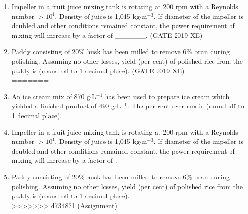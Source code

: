 \documentclass[journal,12pt,onecolumn]{IEEEtran}
\begin{document}
\begin{enumerate}
\item Impeller in a fruit juice mixing tank is rotating at 200 rpm with a Reynolds number $>10^{4}$. Density of juice is 1,045 kg$\cdot$m$^{-3}$. If diameter of the impeller is doubled and other conditions remained constant, the power requirement of mixing will increase by a factor of \_\_\_\_\_\_.
\hfill{(GATE 2019 XE)} \\


\item Paddy consisting of 20\% husk has been milled to remove 6\% bran during polishing. Assuming no other losses, yield (per cent) of polished rice from the paddy is \underline{\hspace{2cm}} (round off to 1 decimal place).
\hfill{(GATE 2019 XE)} \\

=======

\vspace{0.5cm}

\item An ice cream mix of 870 g$\cdot$L$^{-1}$ has been used to prepare ice cream which yielded a finished product of 490 g$\cdot$L$^{-1}$. The per cent over run is \underline{\hspace{2cm}} (round off to 1 decimal place).
\hfill{} \\

\vspace{0.5cm}

\item Impeller in a fruit juice mixing tank is rotating at 200 rpm with a Reynolds number $>10^{4}$. Density of juice is 1,045 kg$\cdot$m$^{-3}$. If diameter of the impeller is doubled and other conditions remained constant, the power requirement of mixing will increase by a factor of \underline{\hspace{2cm}}.
\hfill{} \\

\vspace{0.5cm}

\item Paddy consisting of 20\% husk has been milled to remove 6\% bran during polishing. Assuming no other losses, yield (per cent) of polished rice from the paddy is \underline{\hspace{2cm}} (round off to 1 decimal place).
\hfill{} \\

\vspace{0.5cm}
>>>>>>> d734831 (Assignment)


\end{enumerate}
\end{document}
